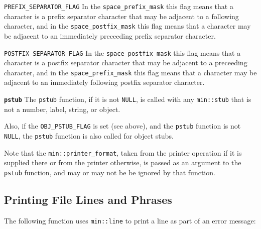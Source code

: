 \documentclass[12pt]{article}
\makeatletter
\newcommand{\ttmkey}[2]{{\tt \bf #1}\index{#1@{\tt #1}!#2}}
\newcommand{\ttnbmkey}[2]{{\tt #1}\index{#1@{\tt #1}!#2}}
\newcommand{\EOL}{\penalty \exhyphenpenalty}
\newenvironment{indpar}[1][0.3in]%
	{\begin{list}{}%
		     {\setlength{\itemsep}{0in}%
		      \setlength{\topsep}{0in}%
		      \setlength{\parsep}{1ex}%
		      \setlength{\labelwidth}{#1}%
		      \setlength{\leftmargin}{#1}%
		      \addtolength{\leftmargin}{\labelsep}}%
	 \item}%
	{\end{list}}
\newenvironment{itemlist}[1][1.2in]%
	{\begin{list}{}{\setlength{\labelwidth}{#1}%
		        \setlength{\leftmargin}{\labelwidth}%
		        \addtolength{\leftmargin}{+0.2in}%
		        \renewcommand{\makelabel}[1]{##1\hfill}}}%
	{\end{list}}
\makeatother
\begin{document}
\begin{indpar}\begin{itemlist}[1.9in]

\item[\ttnbmkey{PREFIX\_SEPARATOR\_FLAG}{{\tt min::printer\_format} flag}]
In the {\tt space\_\EOL prefix\_\EOL mask} this flag means that a character
is a prefix separator character that may be adjacent to a following character,
and in the {\tt space\_\EOL postfix\_\EOL mask} this flag means that
a character may be adjacent to an immediately preceeding prefix separator
character.

\item[\ttnbmkey{POSTFIX\_SEPARATOR\_FLAG}{{\tt min::printer\_format} flag}]
In the {\tt space\_\EOL postfix\_\EOL mask} this flag means that a character
is a postfix separator character that may be adjacent to a preceeding character,
and in the {\tt space\_\EOL prefix\_\EOL mask} this flag means that
a character may be adjacent to an immediately following postfix separator
character.

\end{itemlist}\end{indpar}

\begin{itemlist}

\item[\ttmkey{pstub}{in {\tt min::printer\_format}}]
The {\tt pstub} function, if it is not {\tt NULL}, is called
with any {\tt min::stub} that is not a number, label, string, or object.

Also, if the {\tt OBJ\_\EOL PSTUB\_\EOL FLAG} is set (see above),
and the {\tt pstub} function is not {\tt NULL}, the {\tt pstub} function is
also called for object stubs.

Note that the {\tt min::\EOL printer\_\EOL format}, taken from the
printer operation if it is supplied there or from the printer otherwise,
is passed as an argument to the {\tt pstub} function,
and may or may not be be ignored by that function.

\end{itemlist}

\subsection{Printing File Lines and Phrases}
\label{PRINTING-FILE-LINES-AND-PHRASES}

The following function uses {\tt min::line} to print a line as part of
an error message:
\end{document}
